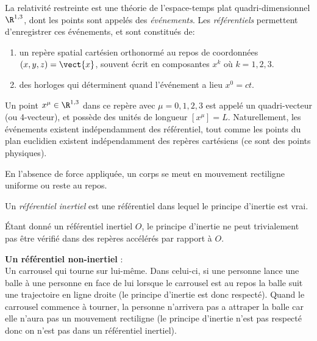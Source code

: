 La relativité restreinte est une théorie de l'espace-temps plat quadri-dimensionnel $\R ^{1,3}$, dont les points sont appelés des \emph{événements}. Les \emph{référentiels} permettent d'enregistrer ces événements, et sont constitués de:
\begin{enumerate}
    \item un repère spatial cartésien orthonormé au repos de coordonnées $(x, y, z) = \vect{x}$, souvent écrit en composantes $x^k$ où $k=1, 2, 3$. 
    \item des horloges qui déterminent quand l'événement a lieu $x^0 = ct$. \\
\end{enumerate}
Un point $x^\mu\in \R^{1,3}$ dans ce repère avec $\mu=0,1,2,3$ est appelé un quadri-vecteur (ou 4-vecteur), et possède des unités de longueur $[x^\mu ] = L$. Naturellement, les événements existent indépendamment des référentiel, tout comme les points du plan euclidien existent indépendamment des repères cartésiens (ce sont des points physiques).
\begin{theoremframe}
\begin{rap}
    En l'absence de force appliquée, un corps se meut en mouvement rectiligne uniforme ou reste au repos.    
\end{rap}
\end{theoremframe}
\begin{theoremframe}
\begin{defi}
Un \emph{référentiel inertiel} est une référentiel dans lequel le principe d'inertie est vrai. 
\end{defi}
\end{theoremframe}
Étant donné un référentiel inertiel $O$, le principe d'inertie ne peut trivialement pas être vérifié dans des repères accélérés par rapport à $O$. 

\begin{exmp}
    \textbf{Un référentiel non-inertiel} :\\
    Un carrousel qui tourne sur lui-même. Dans celui-ci, si une personne lance une balle à une personne en face de lui lorsque le carrousel est au repos la balle suit une trajectoire en ligne droite (le principe d'inertie est donc respecté). Quand le carrousel commence à tourner, la personne n'arrivera pas a attraper la balle car elle n'aura pas un mouvement rectiligne (le principe d'inertie n'est pas respecté donc on n'est pas dans un référentiel inertiel).
\end{exmp}



